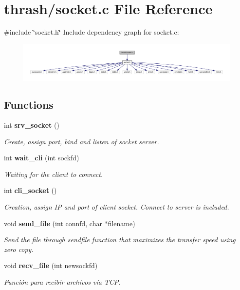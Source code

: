 \section{thrash/socket.c File Reference}
\label{socket_8c}
{\ttfamily \#include \char`\"{}socket.\+h\char`\"{}}\newline
Include dependency graph for socket.\+c\+:\nopagebreak
\begin{figure}[H]
\begin{center}
\leavevmode
\includegraphics[width=350pt]{socket_8c__incl}
\end{center}
\end{figure}
\subsection*{Functions}
\begin{DoxyCompactItemize}
\item 
int \textbf{ srv\+\_\+socket} ()
\begin{DoxyCompactList}\small\item\em Create, assign port, bind and listen of socket server. \end{DoxyCompactList}\item 
int \textbf{ wait\+\_\+cli} (int sockfd)
\begin{DoxyCompactList}\small\item\em Waiting for the client to connect. \end{DoxyCompactList}\item 
int \textbf{ cli\+\_\+socket} ()
\begin{DoxyCompactList}\small\item\em Creation, assign IP and port of client socket. Connect to server is included. \end{DoxyCompactList}\item 
void \textbf{ send\+\_\+file} (int connfd, char $\ast$filename)
\begin{DoxyCompactList}\small\item\em Send the file through sendfile function that maximizes the transfer speed using zero copy. \end{DoxyCompactList}\item 
void \textbf{ recv\+\_\+file} (int newsockfd)
\begin{DoxyCompactList}\small\item\em Función para recibir archivos vía T\+CP. \end{DoxyCompactList}\end{DoxyCompactItemize}


